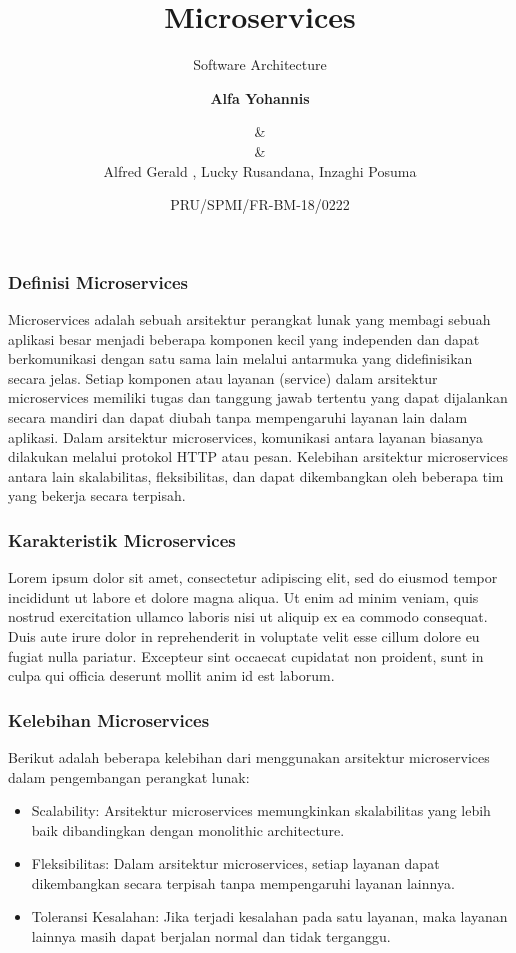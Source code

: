 \documentclass[aspectratio=169, table]{beamer}
\subtitle{Software Architecture}
\date[Serial]{\scriptsize {PRU/SPMI/FR-BM-18/0222}}
\author[Pradita]{\small {\textbf{Alfa Yohannis}}}
\title{Microservices}
\author{\&\\ \&\\ Alfred Gerald , Lucky Rusandana, Inzaghi Posuma }
\begin{document}
	
	\frame{\titlepage}
	
	\begin{frame}
		\frametitle{Definisi Microservices}
		Microservices adalah sebuah arsitektur perangkat lunak yang membagi sebuah aplikasi besar menjadi beberapa komponen kecil yang independen dan dapat berkomunikasi dengan satu sama lain melalui antarmuka yang didefinisikan secara jelas. Setiap komponen atau layanan (service) dalam arsitektur microservices memiliki tugas dan tanggung jawab tertentu yang dapat dijalankan secara mandiri dan dapat diubah tanpa mempengaruhi layanan lain dalam aplikasi. Dalam arsitektur microservices, komunikasi antara layanan biasanya dilakukan melalui protokol HTTP atau pesan. Kelebihan arsitektur microservices antara lain skalabilitas, fleksibilitas, dan dapat dikembangkan oleh beberapa tim yang bekerja secara terpisah.
	\end{frame}
	
	\begin{frame}
		\frametitle{Karakteristik Microservices}
		Lorem ipsum dolor sit amet, consectetur adipiscing elit, sed do eiusmod tempor incididunt ut labore et dolore magna aliqua. Ut enim ad minim veniam, quis nostrud exercitation ullamco laboris nisi ut aliquip ex ea commodo consequat. Duis aute irure dolor in reprehenderit in voluptate velit esse cillum dolore eu fugiat nulla pariatur. Excepteur sint occaecat cupidatat non proident, sunt in culpa qui officia deserunt mollit anim id est laborum.
	\end{frame}
	
	\begin{frame}
		\frametitle{Kelebihan Microservices}
		Berikut adalah beberapa kelebihan dari menggunakan arsitektur microservices dalam pengembangan perangkat lunak:
		\begin{itemize}
			\item Scalability: Arsitektur microservices memungkinkan skalabilitas yang lebih baik dibandingkan dengan monolithic architecture.
		\item Fleksibilitas: Dalam arsitektur microservices, setiap layanan dapat dikembangkan secara terpisah tanpa mempengaruhi layanan lainnya.
		\item Toleransi Kesalahan: Jika terjadi kesalahan pada satu layanan, maka layanan lainnya masih dapat berjalan normal dan tidak terganggu.
		\end{itemize}
	\end{frame}
	
\end{document}

